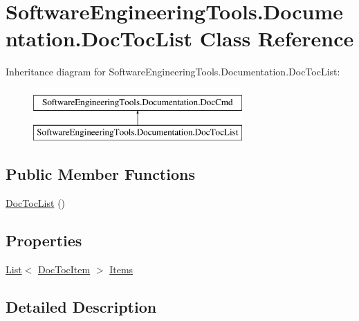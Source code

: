 \hypertarget{class_software_engineering_tools_1_1_documentation_1_1_doc_toc_list}{\section{Software\+Engineering\+Tools.\+Documentation.\+Doc\+Toc\+List Class Reference}
\label{class_software_engineering_tools_1_1_documentation_1_1_doc_toc_list}
}
Inheritance diagram for Software\+Engineering\+Tools.\+Documentation.\+Doc\+Toc\+List\+:\begin{figure}[H]
\begin{center}
\leavevmode
\includegraphics[height=2.000000cm]{class_software_engineering_tools_1_1_documentation_1_1_doc_toc_list}
\end{center}
\end{figure}
\subsection*{Public Member Functions}
\begin{DoxyCompactItemize}
\item 
\hyperlink{class_software_engineering_tools_1_1_documentation_1_1_doc_toc_list_aa5b4b3df90602c001abc87ca73a805df}{Doc\+Toc\+List} ()
\end{DoxyCompactItemize}
\subsection*{Properties}
\begin{DoxyCompactItemize}
\item 
\hyperlink{namespace_software_engineering_tools_1_1_documentation_ae0bccf4f49a76db084c1c316e5954ec9a4ee29ca12c7d126654bd0e5275de6135}{List}$<$ \hyperlink{class_software_engineering_tools_1_1_documentation_1_1_doc_toc_item}{Doc\+Toc\+Item} $>$ \hyperlink{class_software_engineering_tools_1_1_documentation_1_1_doc_toc_list_a2651cd51e7a7cfd9aeb241ca842316dd}{Items}
\end{DoxyCompactItemize}


\subsection{Detailed Description}


